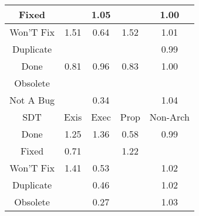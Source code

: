 \begin{tabular}{|c||c|c|c|c|}
\hline
Fixed &  & \cellcolor[rgb]{0.8982746269391613,0.8344458759185501,0.42} 1.05 &  & \cellcolor[rgb]{0.9095038383324753,0.8376515014403827,0.4195369157769769} 1.00 \\ 
\hline
Won'T Fix & \cellcolor[rgb]{0.7888109118328467,0.782594642447138,0.42000000000000004} 1.51 & \cellcolor[rgb]{0.8503460564907921,0.557638000723082,0.36432298605807256} 0.64 & \cellcolor[rgb]{0.786259396342245,0.7813860298463265,0.42} 1.52 & \cellcolor[rgb]{0.9070788571402961,0.8386163007506665,0.42} 1.01 \\ 
\hline
Duplicate &  &  &  & \cellcolor[rgb]{0.9081925890100925,0.8314449213144378,0.41831308307608633} 0.99 \\ 
\hline
Done & \cellcolor[rgb]{0.8788261232195881,0.6924436499060502,0.39090438167161556} 0.81 & \cellcolor[rgb]{0.9034828908232931,0.8091523498969208,0.4139173647684069} 0.96 & \cellcolor[rgb]{0.8811952896611142,0.7036577043959399,0.39311560368370646} 0.83 & \cellcolor[rgb]{0.9090617019483628,0.8395555430281718,0.42} 1.00 \\ 
\hline
Obsolete &  &  &  &  \\ 
\hline
Not A Bug &  & \cellcolor[rgb]{0.8007397375661,0.32283475781287285,0.3180237550616932} 0.34 &  & \cellcolor[rgb]{0.9011411388747992,0.835803697361747,0.42} 1.04 \\ 
\hline
\hline
SDT & Exis & Exec & Prop & Non-Arch \\ 
\hline
Done & \cellcolor[rgb]{0.8513330511763775,0.8122103926624945,0.42} 1.25 & \cellcolor[rgb]{0.8234214849361743,0.7989891244434509,0.42} 1.36 & \cellcolor[rgb]{0.8401837132334631,0.5095362426383919,0.3548381323512322} 0.58 & \cellcolor[rgb]{0.9078222529830451,0.8296919974530801,0.41796743611750875} 0.99 \\ 
\hline
Fixed & \cellcolor[rgb]{0.8613436821401033,0.6096934287964884,0.37458743666409633} 0.71 &  & \cellcolor[rgb]{0.8563890266222941,0.814605328400034,0.42} 1.22 &  \\ 
\hline
Won'T Fix & \cellcolor[rgb]{0.8125578149380777,0.7938431754969841,0.42} 1.41 & \cellcolor[rgb]{0.8318081883652746,0.4698920915956329,0.3470209758075896} 0.53 &  & \cellcolor[rgb]{0.9063058243703251,0.8382501273333117,0.42} 1.02 \\ 
\hline
Duplicate &  & \cellcolor[rgb]{0.8194850997921307,0.41156280568275183,0.3355194264726553} 0.46 &  & \cellcolor[rgb]{0.9055103595964282,0.837873328229887,0.42} 1.02 \\ 
\hline
Obsolete &  & \cellcolor[rgb]{0.788414102279739,0.2644934174574313,0.3065198287944231} 0.27 &  & \cellcolor[rgb]{0.9035703957249167,0.8369543979749605,0.42} 1.03 \\ 

\end{tabular}
